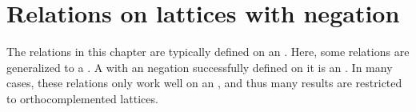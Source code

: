 ﻿%


\chapter{Relations on lattices with negation}


The relations in this chapter are typically defined on 
an  .
Here, some relations are generalized to a  .
A   with an  negation successfully defined on it 
is an  .
In many cases, these relations only work well on an ,
and thus many results are restricted to orthocomplemented lattices.
